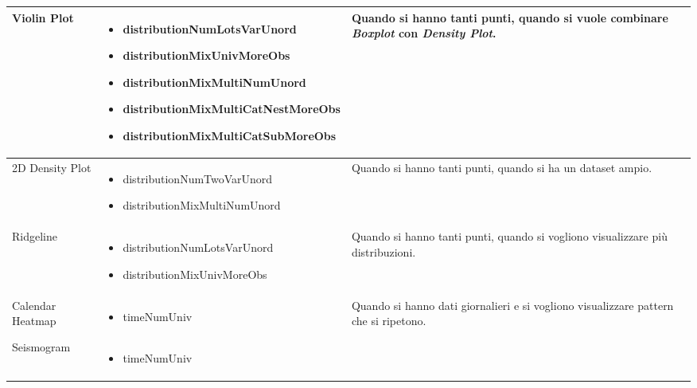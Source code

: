 \begin{xltabular}{\columnwidth}{|p{0.15\columnwidth}|X|p{0.27\columnwidth}|}
    \hline
    Violin Plot & 
    \vspace{-3.5mm}
    \begin{itemize}[noitemsep,topsep=0pt, left=0pt]
        \item distributionNumLotsVarUnord
        \item distributionMixUnivMoreObs
        \item distributionMixMultiNumUnord
        \item distributionMixMultiCatNestMoreObs
        \item distributionMixMultiCatSubMoreObs
    \end{itemize} & 
    Quando si hanno tanti punti, quando si vuole combinare \emph{Boxplot} con \emph{Density Plot}. \\
    \hline
    2D Density Plot & 
    \vspace{-3.5mm}
    \begin{itemize}[noitemsep,topsep=0pt, left=0pt]
        \item distributionNumTwoVarUnord
        \item distributionMixMultiNumUnord
    \end{itemize} & 
    Quando si hanno tanti punti, quando si ha un dataset ampio. \\
    \hline
    Ridgeline & 
    \vspace{-3.5mm}
    \begin{itemize}[noitemsep,topsep=0pt, left=0pt]
        \item distributionNumLotsVarUnord
        \item distributionMixUnivMoreObs
    \end{itemize} & 
    Quando si hanno tanti punti, quando si vogliono visualizzare più distribuzioni. \\
    \hline
    Calendar Heatmap & 
    \vspace{-3.5mm}
    \begin{itemize}[noitemsep,topsep=0pt, left=0pt]
        \item timeNumUniv
    \end{itemize} & 
    Quando si hanno dati giornalieri e si vogliono visualizzare pattern che si ripetono. \\
    \hline
    Seismogram & 
    \vspace{-3.5mm}
    \begin{itemize}[noitemsep,topsep=0pt, left=0pt]
        \item timeNumUniv
    \end{itemize} & 

\end{xltabular}
